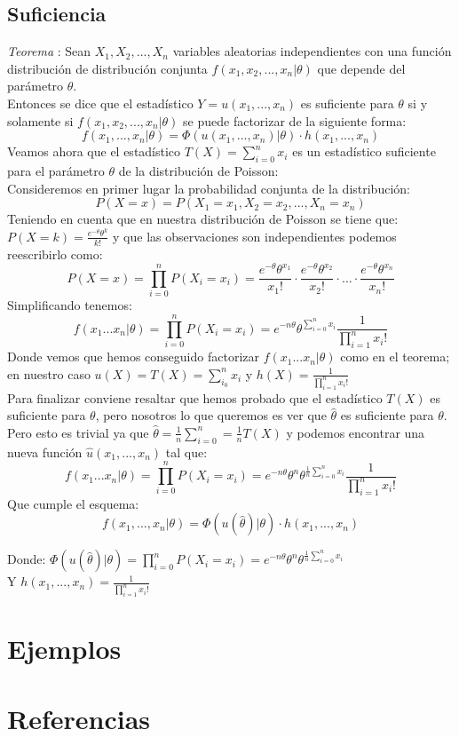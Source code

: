 \documentclass[a4paper, 10pt]{article} %
\newcounter{teo}
\begin{document}
\subsection{Suficiencia}
\addtocounter{teo}{1}
\emph{Teorema }: Sean $X_1, X_2, ..., X_n$ variables aleatorias independientes con una función distribución de distribución conjunta $f(x_1, x_2, ..., x_n | \theta)$ que depende del parámetro $\theta$. \\
Entonces se dice que el estadístico $Y = u(x_1, ..., x_n)$ es suficiente para $\theta$ si y solamente si $f(x_1, x_2, ..., x_n | \theta)$ se puede factorizar de la siguiente forma: \\
$$ f(x_1,...,x_n| \theta) = \Phi(u(x_1, ..., x_n) | \theta)\cdot h(x_1, ..., x_n) $$
Veamos ahora que el estadístico \(T(X) = \sum_{i=0}^n x_i\) es un estadístico suficiente para el parámetro $\theta$ de la distribución de Poisson: \\
Consideremos en primer lugar la probabilidad conjunta de la distribución:
$$P(X=x) = P(X_1 = x_1, X_2 = x_2, ..., X_n = x_n) $$
Teniendo en cuenta que en nuestra distribución de Poisson se tiene que: \(P(X=k) = \frac{e^{-\theta }\theta ^{k}}{k!}\) y que las observaciones son independientes podemos reescribirlo como:
$$P(X=x) = \prod_{i=0}^nP(X_i = x_i) = \frac{e^{-\theta }\theta ^{x_1}}{x_1!}\cdot \frac{e^{-\theta }\theta ^{x_2}}{x_2!}\cdot ... \cdot \frac{e^{-\theta }\theta ^{x_n}}{x_n!}$$
Simplificando tenemos:
$$f(x_1...x_n | \theta) = \prod_{i=0}^nP(X_i = x_i) = e^{-n\theta }\theta ^{\sum_{i=0}^nx_i} \frac{1}{\prod_{i=1}^nx_i!}$$
Donde vemos que hemos conseguido factorizar $f(x_1...x_n | \theta)$ como en el teorema; en nuestro caso $u(X) = T(X) = \sum_{i_0}^n x_i$ y $h(X) =  \frac{1}{\prod_{i=1}^nx_i!}$\\
Para finalizar conviene resaltar que hemos probado que el estadístico $T(X)$ es suficiente para $\theta$, pero nosotros lo que queremos es ver que $\hat{\theta}$ es suficiente para $\theta$.\\
Pero esto es trivial ya que $\hat{\theta} = \frac{1}{n}\sum_{i=0}^n = \frac{1}{n}T(X)$ y podemos encontrar una nueva función $\hat u(x_1,...,x_n)$ tal que:
$$f(x_1...x_n | \theta) = \prod_{i=0}^nP(X_i = x_i) = e^{-n\theta }\theta ^{n}\theta ^{\frac{1}{n}{\sum_{i=0}^nx_i}} \frac{1}{\prod_{i=1}^nx_i!}$$ 
Que cumple el esquema: \\
$$ f(x_1,...,x_n| \theta) = \Phi(u(\hat\theta) | \theta)\cdot h(x_1, ..., x_n) $$

Donde: $\Phi(u(\hat\theta) | \theta) = \prod_{i=0}^nP(X_i = x_i) = e^{-n\theta }\theta ^{n}\theta ^{\frac{1}{n}{\sum_{i=0}^nx_i}}$ \\
Y $h(x_1, ..., x_n) = \frac{1}{\prod_{i=1}^nx_i!}$



\section{Ejemplos}
\section{Referencias}
\end{document}

